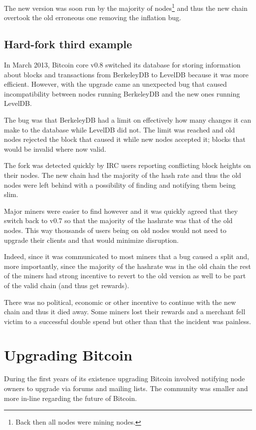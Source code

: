 The new version was soon run by the majority of nodes\footnote{Back then all nodes were mining nodes.} and thus the new chain overtook the old erroneous one removing the inflation bug.


\subsection*{Hard-fork third example}
In March 2013, Bitcoin core v0.8 switched its database for storing information about blocks and transactions from BerkeleyDB to LevelDB because it was more efficient. However, with the upgrade came an unexpected bug that caused incompatibility between nodes running BerkeleyDB and the new ones running LevelDB.

The bug was that BerkeleyDB had a limit on effectively how many changes it can make to the database while LevelDB did not. The limit was reached and old nodes rejected the block that caused it while new nodes accepted it; blocks that would be invalid where now valid.

The fork was detected quickly by IRC users reporting conflicting block heights on their nodes. The new chain had the majority of the hash rate and thus the old nodes were left behind with a possibility of finding and notifying them being slim.

Major miners were easier to find however and it was quickly agreed that they switch back to v0.7 so that the majority of the hashrate was that of the old nodes. This way thousands of users being on old nodes would not need to upgrade their clients and that would minimize disruption. 

Indeed, since it was communicated to most miners that a bug caused a split and, more importantly, since the majority of the hashrate was in the old chain the rest of the miners had strong incentive to revert to the old version as well to be part of the valid chain (and thus get rewards).

There was no political, economic or other incentive to continue with the new chain and thus it died away. Some miners lost their rewards and a merchant fell victim to a successful double spend but other than that the incident was painless.

\section{Upgrading Bitcoin}
During the first years of its existence upgrading Bitcoin involved notifying node owners to upgrade via forums and mailing lists. The community was smaller and more in-line regarding the future of Bitcoin.

